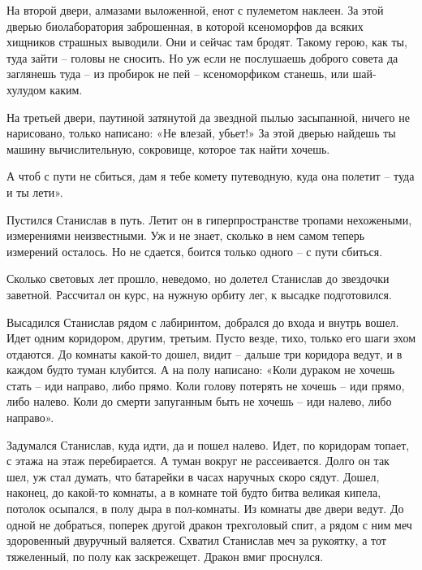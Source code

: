 \documentclass[ebook,oneside,final,openright]{memoir}
\begin{document}
\par
На второй двери, алмазами выложенной, енот с пулеметом наклеен. За этой дверью биолаборатория заброшенная, в которой ксеноморфов да всяких хищников страшных выводили. Они и сейчас там бродят. Такому герою, как ты, туда зайти – головы не сносить. Но уж если не послушаешь доброго совета да заглянешь туда – из пробирок не пей – ксеноморфиком станешь, или шай-хулудом каким.\par
\par
На третьей двери, паутиной затянутой да звездной пылью засыпанной, ничего не нарисовано, только написано: «Не влезай, убьет!» За этой дверью найдешь ты машину вычислительную, сокровище, которое так найти хочешь.\par
\par
А чтоб с пути не сбиться, дам я тебе комету путеводную, куда она полетит – туда и ты лети».\par
\par
Пустился Станислав в путь. Летит он в гиперпространстве тропами нехожеными, измерениями неизвестными. Уж и не знает, сколько в нем самом теперь измерений осталось. Но не сдается, боится только одного – с пути сбиться.\par
\par
Сколько световых лет прошло, неведомо, но долетел Станислав до звездочки заветной. Рассчитал он курс, на нужную орбиту лег, к высадке подготовился.\par
\par
Высадился Станислав рядом с лабиринтом, добрался до входа и внутрь вошел. Идет одним коридором, другим, третьим. Пусто везде, тихо, только его шаги эхом отдаются. До комнаты какой-то дошел, видит – дальше три коридора ведут, и в каждом будто туман клубится. А на полу написано: «Коли дураком не хочешь стать – иди направо, либо прямо. Коли голову потерять не хочешь – иди прямо, либо налево. Коли до смерти запуганным быть не хочешь – иди налево, либо направо».\par
\par
Задумался Станислав, куда идти, да и пошел налево. Идет, по коридорам топает, с этажа на этаж перебирается. А туман вокруг не рассеивается. Долго он так шел, уж стал думать, что батарейки в часах наручных скоро сядут. Дошел, наконец, до какой-то комнаты, а в комнате той будто битва великая кипела, потолок осыпался, в полу дыра в пол-комнаты. Из комнаты две двери ведут. До одной не добраться, поперек другой дракон трехголовый спит, а рядом с ним меч здоровенный двуручный валяется. Схватил Станислав меч за рукоятку, а тот тяжеленный, по полу как заскрежещет. Дракон вмиг проснулся.\par
\end{document}
